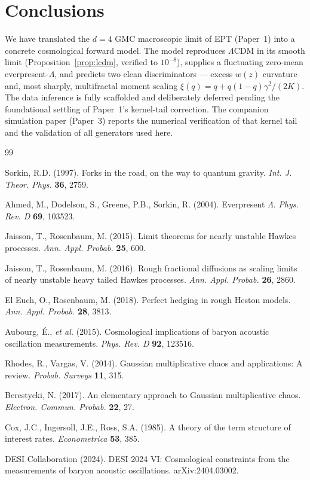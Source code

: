 \documentclass[11pt,a4paper]{article}
\begin{document}
\section{Conclusions}

We have translated the $d=4$ GMC macroscopic limit of EPT (Paper~1) into a concrete cosmological forward model. The model reproduces $\Lambda$CDM in its smooth limit (Proposition~\ref{prop:lcdm}, verified to $10^{-8}$), supplies a fluctuating zero-mean everpresent-$\Lambda$, and predicts two clean discriminators --- excess $w(z)$ curvature and, most sharply, multifractal moment scaling $\xi(q)=q+q(1-q)\gamma^2/(2K)$. The data inference is fully scaffolded and deliberately deferred pending the foundational settling of Paper~1's kernel-tail correction. The companion simulation paper (Paper~3) reports the numerical verification of that kernel tail and the validation of all generators used here.

\begin{thebibliography}{99}

 Sorkin, R.D. (1997). Forks in the road, on the way to quantum gravity. \emph{Int. J. Theor. Phys.} \textbf{36}, 2759.

 Ahmed, M., Dodelson, S., Greene, P.B., Sorkin, R. (2004). Everpresent $\Lambda$. \emph{Phys. Rev. D} \textbf{69}, 103523.

 Jaisson, T., Rosenbaum, M. (2015). Limit theorems for nearly unstable Hawkes processes. \emph{Ann. Appl. Probab.} \textbf{25}, 600.

 Jaisson, T., Rosenbaum, M. (2016). Rough fractional diffusions as scaling limits of nearly unstable heavy tailed Hawkes processes. \emph{Ann. Appl. Probab.} \textbf{26}, 2860.

 El Euch, O., Rosenbaum, M. (2018). Perfect hedging in rough Heston models. \emph{Ann. Appl. Probab.} \textbf{28}, 3813.

 Aubourg, É., \emph{et al.} (2015). Cosmological implications of baryon acoustic oscillation measurements. \emph{Phys. Rev. D} \textbf{92}, 123516.

 Rhodes, R., Vargas, V. (2014). Gaussian multiplicative chaos and applications: A review. \emph{Probab. Surveys} \textbf{11}, 315.

 Berestycki, N. (2017). An elementary approach to Gaussian multiplicative chaos. \emph{Electron. Commun. Probab.} \textbf{22}, 27.

 Cox, J.C., Ingersoll, J.E., Ross, S.A. (1985). A theory of the term structure of interest rates. \emph{Econometrica} \textbf{53}, 385.

 DESI Collaboration (2024). DESI 2024 VI: Cosmological constraints from the measurements of baryon acoustic oscillations. arXiv:2404.03002.

\end{thebibliography}
\end{document}

